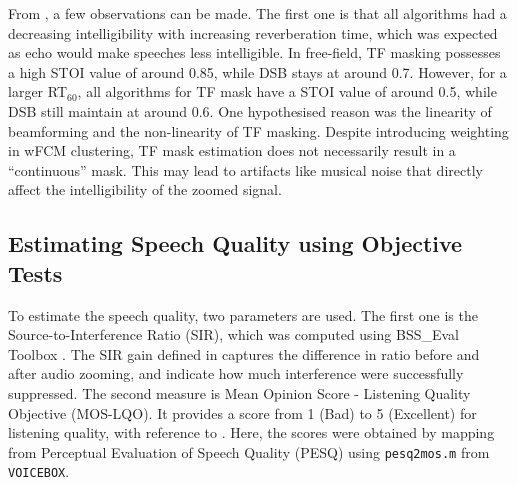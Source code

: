 \documentclass[a4paper,twoside,12pt,hidelinks]{article}
\begin{document}
From , a few observations can be made. The first one is that all algorithms had a decreasing intelligibility with increasing reverberation time, which was expected as echo would make speeches less intelligible. In free-field, TF masking possesses a high STOI value of around 0.85, while DSB stays at around 0.7. However, for a larger RT$_{60}$, all algorithms for TF mask have a STOI value of around 0.5, while DSB still maintain at around 0.6. One hypothesised reason was the linearity of beamforming and the non-linearity of TF masking. Despite introducing weighting in wFCM clustering, TF mask estimation does not necessarily result in a ``continuous'' mask. This may lead to artifacts like musical noise that directly  affect the intelligibility of the zoomed signal.

\subsection{Estimating Speech Quality using Objective Tests}
To estimate the speech quality, two parameters are used. The first one is the Source-to-Interference Ratio (SIR), which was computed using BSS\_Eval Toolbox \cite{Fevotte2005BSS_EVAL2.0}. The SIR gain defined in  captures the difference in ratio before and after audio zooming, and indicate how much interference were successfully suppressed. The second measure is Mean Opinion Score - Listening Quality Objective (MOS-LQO). It provides a score from 1 (Bad) to 5 (Excellent) for listening quality, with reference to . Here, the scores were obtained by mapping from Perceptual Evaluation of Speech Quality (PESQ) using \texttt{pesq2mos.m} from \texttt{VOICEBOX}.
\end{document}
